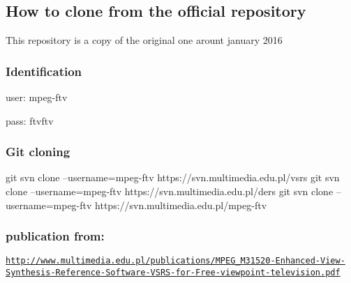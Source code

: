 \subsection*{How to clone from the official repository}

This repository is a copy of the original one arount january 2016

\subsubsection*{Identification}

user\+: mpeg-\/ftv

pass\+: ftvftv

\subsubsection*{Git cloning}


\begin{DoxyCode}
git svn clone --username=mpeg-ftv https://svn.multimedia.edu.pl/vsrs
git svn clone --username=mpeg-ftv https://svn.multimedia.edu.pl/ders
git svn clone --username=mpeg-ftv https://svn.multimedia.edu.pl/mpeg-ftv
\end{DoxyCode}


\subsubsection*{publication from\+:}

\href{publications-2013-MPEG_M31520.pdf}{\tt http\+://www.\+multimedia.\+edu.\+pl/publications/\+M\+P\+E\+G\+\_\+\+M31520-\/\+Enhanced-\/\+View-\/\+Synthesis-\/\+Reference-\/\+Software-\/\+V\+S\+R\+S-\/for-\/\+Free-\/viewpoint-\/television.\+pdf} 